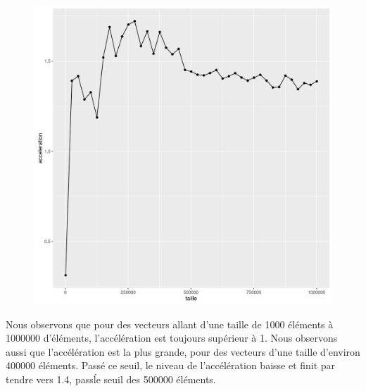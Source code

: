 \documentclass[a4paper,11pt]{scrartcl}
\begin{document}
\begin{figure}[H] \center
   \includegraphics[scale=0.5] {graphes/global_temps_machine_accel9.png}
\end{figure}

Nous observons que pour des vecteurs allant d'une taille de 1000 \'el\'ements \`a 1000000 d'\'el\'ements, l'acc\'el\'eration est toujours sup\'erieur \`a 1. Nous observons aussi que l'acc\'el\'eration est la plus grande, pour des vecteurs d'une taille d'environ 400000 \'el\'ements. Pass\'e ce seuil, le niveau de l'acc\'el\'eration baisse et finit par tendre vers 1.4, pass\' le seuil des 500000 \'el\'ements.   
\end{document}
